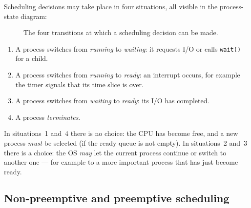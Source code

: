 \documentclass[11pt,a4paper]{article}
\newcommand{\cmd}[1]{\texttt{#1}}
\begin{document}
Scheduling decisions may take place in four situations, all visible in the process-state diagram:

\begin{figure}[H]
\centering
{}
\caption{The four transitions at which a scheduling decision can be made.}
\end{figure}

\begin{enumerate}[leftmargin=1.4em]
  \item A process switches from \emph{running} to \emph{waiting}: it requests I/O or calls \cmd{wait()} for a child.
  \item A process switches from \emph{running} to \emph{ready}: an interrupt occurs, for example the timer signals that its time slice is over.
  \item A process switches from \emph{waiting} to \emph{ready}: its I/O has completed.
  \item A process \emph{terminates}.
\end{enumerate}

In situations~1 and~4 there is no choice: the CPU has become free, and a new process \emph{must} be selected (if the ready queue is not empty). In situations~2 and~3 there is a choice: the OS \emph{may} let the current process continue or switch to another one --- for example to a more important process that has just become ready.

\subsection{Non-preemptive and preemptive scheduling}
\end{document}
